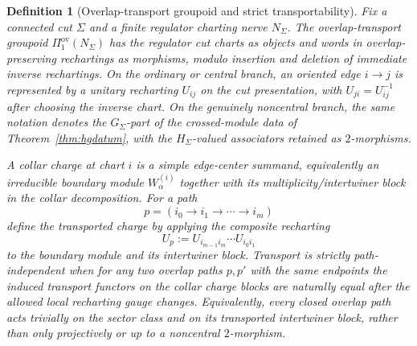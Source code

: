 \documentclass[11pt]{article}
\newtheorem{definition}[theorem]{Definition}
\begin{document}
\begin{definition}[Overlap-transport groupoid and strict transportability]\label{def:overlap-transport}
Fix a connected cut \(\Sigma\) and a finite regulator charting nerve \(N_\Sigma\). The
\emph{overlap-transport groupoid} \(\Pi_1^{\mathrm{ov}}(N_\Sigma)\) has the regulator cut
charts as objects and words in overlap-preserving rechartings as morphisms, modulo insertion and
deletion of immediate inverse rechartings. On the ordinary or central branch, an oriented edge
\(i\to j\) is represented by a unitary recharting \(U_{ij}\) on the cut presentation, with
\(U_{ji}=U_{ij}^{-1}\) after choosing the inverse chart. On the genuinely noncentral branch,
the same notation denotes the \(G_\Sigma\)-part of the crossed-module data of
Theorem~\ref{thm:hgdatum}, with the \(H_\Sigma\)-valued associators retained as \(2\)-morphisms.

A collar charge at chart \(i\) is a simple edge-center summand, equivalently an irreducible
boundary module \(W_\alpha^{(i)}\) together with its multiplicity/intertwiner block in the
collar decomposition. For a path
\[
p=(i_0\to i_1\to\cdots\to i_m)
\]
define the transported charge by applying the composite recharting
\[
U_p:=U_{i_{m-1}i_m}\cdots U_{i_0i_1}
\]
to the boundary module and its intertwiner block. Transport is \emph{strictly path-independent}
when for any two overlap paths \(p,p'\) with the same endpoints the induced transport functors
on the collar charge blocks are naturally equal after the allowed local recharting gauge changes.
Equivalently, every closed overlap path acts trivially on the sector class and on its transported
intertwiner block, rather than only projectively or up to a noncentral \(2\)-morphism.
\end{definition}
\end{document}
